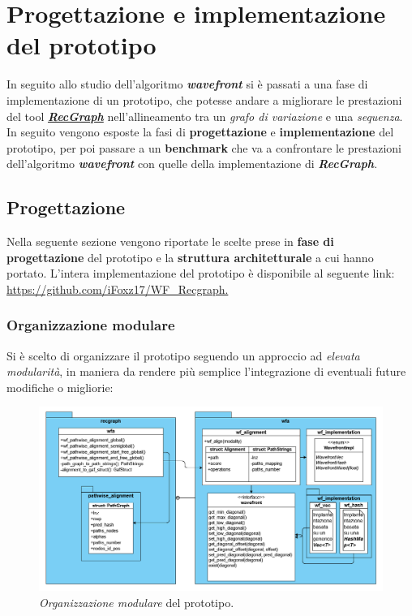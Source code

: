 \chapter{Progettazione e implementazione del prototipo}
In seguito allo studio dell'algoritmo \textbf{\textit{wavefront}} si è passati a una fase di implementazione di un prototipo, che potesse andare a migliorare le prestazioni del tool \href{https://github.com/AlgoLab/RecGraph}{\textbf{\textit{RecGraph}}} \cite{Recgraph} nell'allineamento tra un \emph{grafo di variazione} e una \emph{sequenza}. In seguito vengono esposte la fasi di \textbf{progettazione} e \textbf{implementazione} del prototipo, per poi passare a un \textbf{benchmark} che va a confrontare le prestazioni dell'algoritmo \textbf{\textit{wavefront}} con quelle della implementazione di \textbf{\textit{RecGraph}}.   

\section{Progettazione}
    Nella seguente sezione vengono riportate le scelte prese in \textbf{fase di progettazione} del prototipo e la \textbf{struttura architetturale} a cui hanno portato. L'intera implementazione del prototipo è disponibile al seguente link: \\
    \href{https://github.com/iFoxz17/WF_Recgraph}{https://github.com/iFoxz17/WF\_Recgraph.} 
\subsection{Organizzazione modulare}
    Si è scelto di organizzare il prototipo seguendo un approccio ad \emph{elevata modularità}, in maniera da rendere più semplice l'integrazione di eventuali future modifiche o migliorie:
    
    \begin{figure}[ht]
        \centering
        \includegraphics[width=1\linewidth]{images/wf_modules.png}
        \caption[Organizzazione modulare del prototipo]{\emph{Organizzazione modulare} del prototipo.}
        \label{fig:wf_modules}
    \end{figure}

